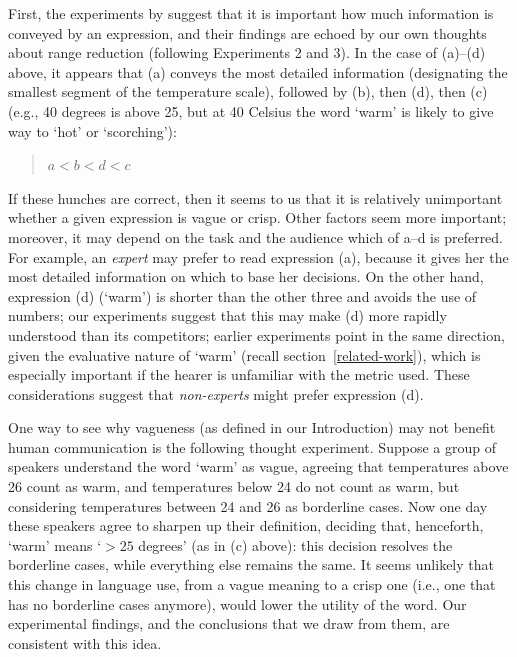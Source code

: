 \documentclass[ %
  graybox       %
 ,envcountchap  %
 ,sectrefs      %
]{svmono}
\begin{document}
First, the experiments by \citeauthor{Mishra01042011} suggest that it is important how much information is conveyed by an expression, and their findings are echoed by our own thoughts about range reduction (following Experiments 2 and 3). In the case of (a)--(d) above, it appears that (a) conveys the most detailed information (designating the smallest segment of the temperature scale), followed by (b), then (d), then (c) (e.g., 40 degrees is above 25, but at 40 Celsius the word `warm' is likely to give way to `hot' or `scorching'):
%
\begin{quote}
$a < b < d < c$
\end{quote}
%
If these hunches are correct, then it seems to us that it is relatively unimportant whether a given expression is vague or crisp. Other factors seem more important; moreover, it may depend on the task and the audience which of a--d is preferred. For example, an \emph{expert} may prefer to read expression (a), because it gives her the most detailed information on which to base her decisions. On the other hand, expression (d) (`warm') is shorter than the other three and avoids the use of numbers; our experiments suggest that this may make (d) more rapidly understood than its competitors; earlier experiments point in the same direction, given the evaluative nature of `warm' (recall section~\ref{related-work}), which is especially important if the hearer is unfamiliar with the metric used. These considerations suggest that {\em non-experts} might prefer expression (d).

One way to see why vagueness (as defined in our Introduction) may not benefit human communication is the following thought experiment. Suppose a group of speakers understand the word `warm' as vague, agreeing that temperatures above 26 count as warm, and temperatures below 24 do not count as warm, but considering temperatures between 24 and 26 as borderline cases. Now one day these speakers agree to sharpen up their definition, deciding that, henceforth, `warm' means `$>25$ degrees' (as in (c) above): this decision resolves the borderline cases, while everything else remains the same. It seems unlikely that this change in language use, from a vague meaning to a crisp one (i.e., one that has no borderline cases anymore), would lower the utility of the word. Our experimental findings, and the conclusions that we draw from them, are consistent with this idea.

\backmatter


\backmatter
\end{document}
